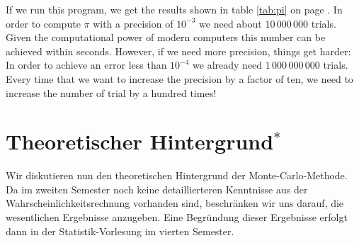 If we run this program, we get the results shown in table \ref{tab:pi} on page \pageref{tab:pi}.
In order to compute $\pi$ with a precision of $10^{-3}$ we need about $10\,000\,000$ trials.  Given the
computational power of modern computers this number can be achieved within seconds.  However,  if we need more
precision, things get harder:  In order to achieve an error less than  $10^{-4}$ we already need
$1\,000\,000\,000$ trials.  Every time that we want to increase the precision by a factor of ten, we need to
increase the number of trial by a hundred times!


\begin{center}
\colorbox{red}{}
\end{center}

\section[Theory]{Theoretischer Hintergrund$^*$}
Wir diskutieren nun den theoretischen Hintergrund der Monte-Carlo-Methode.  Da im zweiten Semester noch
keine detaillierteren Kenntnisse aus der Wahrscheinlichkeits\-rechnung vorhanden sind, beschr\"anken wir
uns darauf, die wesentlichen Ergebnisse anzugeben.  Eine Begr\"undung dieser Ergebnisse erfolgt dann
in der Statistik-Vorlesung im vierten Semester. 

